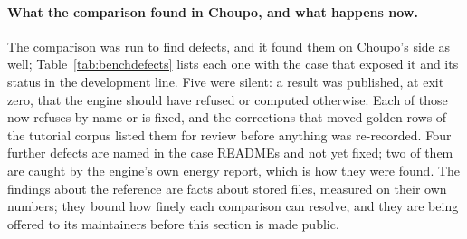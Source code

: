 \documentclass[11pt,a4paper]{article}
\begin{document}
\paragraph{What the comparison found in Choupo, and what happens now.}
The comparison was run to find defects, and it found them on Choupo's side
as well; Table~\ref{tab:benchdefects} lists each one with the case that
exposed it and its status in the development line.  Five were silent: a
result was published, at exit zero, that the engine should have refused or
computed otherwise.  Each of those now refuses by name or is fixed, and
the corrections that moved golden rows of the tutorial corpus listed them
for review before anything was re-recorded.
Four further defects are named in the case READMEs and not yet fixed; two
of them are caught by the engine's own energy report, which is how they
were found.  The findings about the reference are facts about stored
files, measured on their own numbers; they bound how finely each
comparison can resolve, and they are being offered to its maintainers
before this section is made public.
\end{document}
